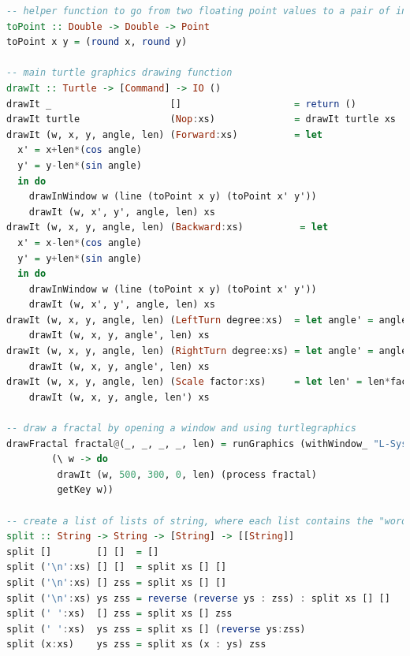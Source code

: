 \documentclass{article}
\begin{document}
\begin{lstlisting}[language=Haskell]
-- helper function to go from two floating point values to a pair of integers
toPoint :: Double -> Double -> Point
toPoint x y = (round x, round y)

-- main turtle graphics drawing function
drawIt :: Turtle -> [Command] -> IO ()
drawIt _                     []                    = return ()
drawIt turtle                (Nop:xs)              = drawIt turtle xs
drawIt (w, x, y, angle, len) (Forward:xs)          = let
  x' = x+len*(cos angle)
  y' = y-len*(sin angle)
  in do
    drawInWindow w (line (toPoint x y) (toPoint x' y'))
    drawIt (w, x', y', angle, len) xs
drawIt (w, x, y, angle, len) (Backward:xs)          = let
  x' = x-len*(cos angle)
  y' = y+len*(sin angle)
  in do
    drawInWindow w (line (toPoint x y) (toPoint x' y'))
    drawIt (w, x', y', angle, len) xs
drawIt (w, x, y, angle, len) (LeftTurn degree:xs)  = let angle' = angle+(fromIntegral degree)*pi/180 in
    drawIt (w, x, y, angle', len) xs
drawIt (w, x, y, angle, len) (RightTurn degree:xs) = let angle' = angle-(fromIntegral degree)*pi/180 in
    drawIt (w, x, y, angle', len) xs
drawIt (w, x, y, angle, len) (Scale factor:xs)     = let len' = len*factor in
    drawIt (w, x, y, angle, len') xs

-- draw a fractal by opening a window and using turtlegraphics
drawFractal fractal@(_, _, _, _, len) = runGraphics (withWindow_ "L-System using Turtle Graphics" (1000, 600)
        (\ w -> do
         drawIt (w, 500, 300, 0, len) (process fractal)
         getKey w))

-- create a list of lists of string, where each list contains the "words" of one line
split :: String -> String -> [String] -> [[String]]
split []        [] []  = []
split ('\n':xs) [] []  = split xs [] []
split ('\n':xs) [] zss = split xs [] []
split ('\n':xs) ys zss = reverse (reverse ys : zss) : split xs [] []
split (' ':xs)  [] zss = split xs [] zss
split (' ':xs)  ys zss = split xs [] (reverse ys:zss)
split (x:xs)    ys zss = split xs (x : ys) zss


\end{lstlisting}
\end{document}
